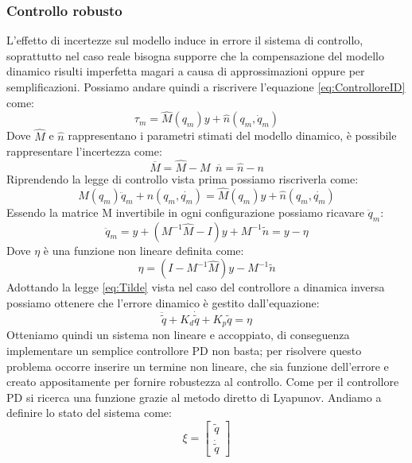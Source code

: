 \subsubsection{Controllo robusto}
 L'effetto di incertezze sul modello induce in errore il sistema di controllo, soprattutto nel caso reale bisogna supporre che la compensazione del modello dinamico risulti imperfetta magari a causa di approssimazioni oppure per semplificazioni.  Possiamo andare quindi a riscrivere l'equazione \ref{eq:ControlloreID} come:
\begin{equation}
\tau_m = \hat{M}(q_m)y + \hat{n}(q_m,\dot{q}_m)
\end{equation}
Dove $\hat{M}$ e $\hat{n}$ rappresentano i parametri stimati del modello dinamico, è possibile rappresentare l'incertezza come:
\begin{equation*}
\overline{M} = \hat{M}- M \ \ \overline{n} = \hat{n} - n
\end{equation*}  
Riprendendo la legge di controllo vista prima possiamo riscriverla come:
\begin{equation}
M(q_m)\ddot{q}_m + n(q_m,\dot{q_m}) = \hat{M}(q_m)y + \hat{n}(q_m,\dot{q_m})
\end{equation}
Essendo la matrice M invertibile in ogni configurazione possiamo ricavare $\ddot{q}_m$:
\begin{equation*}
\ddot{q}_m = y + (M^{-1}\hat{M}-I)y+M^{-1}\tilde{n} = y-\eta
\end{equation*}
Dove $\eta$ è una funzione non lineare definita come: \begin{equation}
\eta = (I-M^{-1}\hat{M})y - M^{-1}\tilde{n} 
\end{equation}
Adottando la legge \ref{eq:Tilde} vista nel caso del controllore a dinamica inversa possiamo ottenere che l'errore dinamico è gestito dall'equazione:
\begin{equation}
\ddot{\tilde{q}} + K_d \dot{\tilde{q}} + K_p\tilde{q} = \eta
\end{equation}
Otteniamo quindi un sistema non lineare e accoppiato, di conseguenza implementare un semplice controllore PD non basta; per risolvere questo problema occorre inserire un termine non lineare, che sia funzione dell'errore e creato appositamente per fornire robustezza al controllo. Come per il controllore PD si ricerca una funzione grazie al metodo diretto di Lyapunov. 
Andiamo a definire lo stato del sistema come:
\begin{equation*}
\xi = \begin{bmatrix}
\tilde{q} \\ \dot{\tilde{q}}
\end{bmatrix}
\end{equation*}
